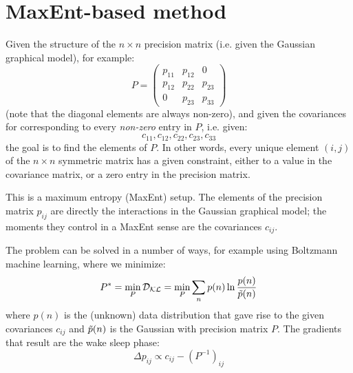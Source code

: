 \documentclass[11pt]{article}
\begin{document}

\section{MaxEnt-based method}


Given the structure of the $n\times n$ precision matrix (i.e. given the Gaussian graphical model), for example:
\begin{equation}
P = \begin{pmatrix}
	p_{11} & p_{12} & 0 \\
	p_{12} & p_{22} & p_{23} \\
	0 & p_{23} & p_{33}
\end{pmatrix}
\end{equation}
(note that the diagonal elements are always non-zero), and given the covariances for corresponding to every \textit{non-zero} entry in $P$, i.e. given:
\begin{equation}
c_{11}, c_{12}, c_{22}, c_{23}, c_{33}
\end{equation}
the goal is to find the elements of $P$. In other words, every unique element $(i,j)$ of the $n\times n$ symmetric matrix has a given constraint, either to a value in the covariance matrix, or a zero entry in the precision matrix.

This is a maximum entropy (MaxEnt) setup. The elements of the precision matrix $p_{ij}$ are directly the interactions in the Gaussian graphical model; the moments they control in a MaxEnt sense are the covariances $c_{ij}$.

The problem can be solved in a number of ways, for example using Boltzmann machine learning, where we minimize:
\begin{equation}
P^* = \underset{P}{\text{min}} \, \mathcal{D}_{\mathcal{K}\mathcal{L}} = \underset{P}{\text{min}} \sum_n p(n) \ln \frac{p(n)}{{\tilde{p}}(n)}
\end{equation}
where $p(n)$ is the (unknown) data distribution that gave rise to the given covariances $c_{ij}$ and ${\tilde{p}}(n)$ is the Gaussian with precision matrix $P$. The gradients that result are the wake sleep phase:
\begin{equation}
\Delta p_{ij} \propto c_{ij} - (P^{-1})_{ij}
\end{equation}
\end{document}
